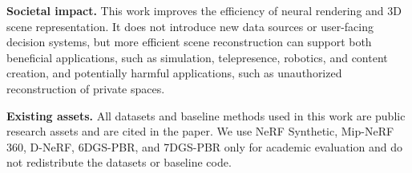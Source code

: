 \documentclass{article}
\theoremstyle{plain}
\theoremstyle{definition}
\theoremstyle{remark}
\begin{document}
\textbf{Societal impact.}
This work improves the efficiency of neural rendering and 3D scene representation. It does not introduce new data sources or user-facing decision systems, but more efficient scene reconstruction can support both beneficial applications, such as simulation, telepresence, robotics, and content creation, and potentially harmful applications, such as unauthorized reconstruction of private spaces.

\textbf{Existing assets.}
All datasets and baseline methods used in this work are public research assets and are cited in the paper. We use NeRF Synthetic, Mip-NeRF 360, D-NeRF, 6DGS-PBR, and 7DGS-PBR only for academic evaluation and do not redistribute the datasets or baseline code.

\newpage

\end{document}
